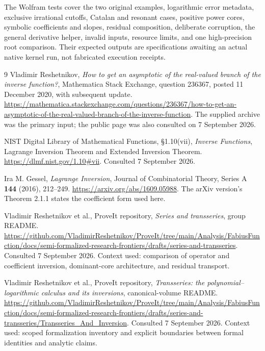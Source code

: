 \documentclass[11pt,a4paper]{article}
\numberwithin{equation}{section}
\theoremstyle{definition}
\begin{document}
The Wolfram tests cover the two original examples, logarithmic error
metadata, exclusive irrational cutoffs, Catalan and resonant cases,
positive power cores, symbolic coefficients and slopes, residual
composition, deliberate corruption, the general derivative helper,
invalid inputs, resource limits, and one high-precision root comparison.
Their expected outputs are specifications awaiting an actual native
kernel run, not fabricated execution receipts.

\clearpage
\begin{thebibliography}{9}
Vladimir Reshetnikov,
\emph{How to get an asymptotic of the real-valued branch of the inverse
function?}, Mathematica Stack Exchange, question 236367, posted
11 December 2020, with subsequent update.
\url{https://mathematica.stackexchange.com/questions/236367/how-to-get-an-asymptotic-of-the-real-valued-branch-of-the-inverse-function}.
The supplied archive was the primary input; the public page was also
consulted on 7 September 2026.

NIST Digital Library of Mathematical Functions,
\S1.10(vii), \emph{Inverse Functions}, Lagrange Inversion Theorem and
Extended Inversion Theorem.
\url{https://dlmf.nist.gov/1.10#vii}.
Consulted 7 September 2026.

Ira M. Gessel, \emph{Lagrange Inversion},
Journal of Combinatorial Theory, Series A \textbf{144} (2016), 212--249.
\url{https://arxiv.org/abs/1609.05988}.
The arXiv version's Theorem 2.1.1 states the coefficient form used here.

Vladimir Reshetnikov et al., ProveIt repository,
\emph{Series and transseries}, group README.
\url{https://github.com/VladimirReshetnikov/ProveIt/tree/main/Analysis/FabiusFunction/docs/semi-formalized-research-frontiers/drafts/series-and-transseries}.
Consulted 7 September 2026. Context used: comparison of operator and
coefficient inversion, dominant-core architecture, and residual transport.

Vladimir Reshetnikov et al., ProveIt repository,
\emph{Transseries: the polynomial--logarithmic calculus and its inversions},
canonical-volume README.
\url{https://github.com/VladimirReshetnikov/ProveIt/tree/main/Analysis/FabiusFunction/docs/semi-formalized-research-frontiers/drafts/series-and-transseries/Transseries_And_Inversion}.
Consulted 7 September 2026. Context used: scoped formalization inventory
and explicit boundaries between formal identities and analytic claims.


\end{thebibliography}
\end{document}

